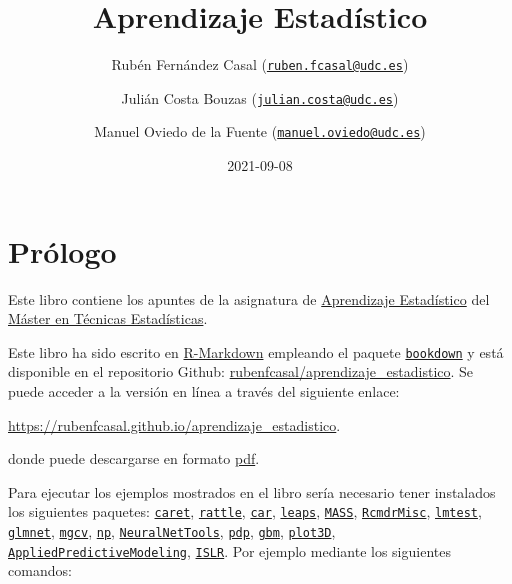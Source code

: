 \documentclass[
]{book}
\title{Aprendizaje Estadístico}
\author{Rubén Fernández Casal (\href{mailto:ruben.fcasal@udc.es}{\nolinkurl{ruben.fcasal@udc.es}}) \and Julián Costa Bouzas (\href{mailto:julian.costa@udc.es}{\nolinkurl{julian.costa@udc.es}}) \and Manuel Oviedo de la Fuente (\href{mailto:manuel.oviedo@udc.es}{\nolinkurl{manuel.oviedo@udc.es}})}
\date{2021-09-08}
\theoremstyle{break}
\theoremstyle{definition}
\theoremstyle{definition}
\theoremstyle{definition}
\theoremstyle{definition}
\theoremstyle{remark}
\begin{document}
\maketitle

{
\setcounter{tocdepth}{1}
\tableofcontents
}
\hypertarget{pruxf3logo}{%
\chapter*{Prólogo}\label{pruxf3logo}}

Este libro contiene los apuntes de la asignatura de \href{http://eamo.usc.es/pub/mte/index.php?option=com_content\&view=article\&id=74}{Aprendizaje Estadístico} del \href{http://eio.usc.es/pub/mte}{Máster en Técnicas Estadísticas}.

Este libro ha sido escrito en \href{http://rmarkdown.rstudio.com}{R-Markdown} empleando el paquete \href{https://bookdown.org/yihui/bookdown/}{\texttt{bookdown}} y está disponible en el repositorio Github: \href{https://github.com/rubenfcasal/aprendizaje_estadistico}{rubenfcasal/aprendizaje\_estadistico}.
Se puede acceder a la versión en línea a través del siguiente enlace:

\url{https://rubenfcasal.github.io/aprendizaje_estadistico}.

donde puede descargarse en formato \href{https://rubenfcasal.github.io/aprendizaje_estadistico/aprendizaje_estadistico.pdf}{pdf}.

Para ejecutar los ejemplos mostrados en el libro sería necesario tener instalados los siguientes paquetes:
\href{https://CRAN.R-project.org/package=caret}{\texttt{caret}}, \href{https://CRAN.R-project.org/package=rattle}{\texttt{rattle}}, \href{https://CRAN.R-project.org/package=car}{\texttt{car}}, \href{https://CRAN.R-project.org/package=leaps}{\texttt{leaps}}, \href{https://CRAN.R-project.org/package=MASS}{\texttt{MASS}}, \href{https://CRAN.R-project.org/package=RcmdrMisc}{\texttt{RcmdrMisc}}, \href{https://CRAN.R-project.org/package=lmtest}{\texttt{lmtest}}, \href{https://CRAN.R-project.org/package=glmnet}{\texttt{glmnet}}, \href{https://CRAN.R-project.org/package=mgcv}{\texttt{mgcv}}, \href{https://CRAN.R-project.org/package=np}{\texttt{np}}, \href{https://CRAN.R-project.org/package=NeuralNetTools}{\texttt{NeuralNetTools}}, \href{https://CRAN.R-project.org/package=pdp}{\texttt{pdp}}, \href{https://CRAN.R-project.org/package=gbm}{\texttt{gbm}}, \href{https://CRAN.R-project.org/package=plot3D}{\texttt{plot3D}}, \href{https://CRAN.R-project.org/package=AppliedPredictiveModeling}{\texttt{AppliedPredictiveModeling}}, \href{https://CRAN.R-project.org/package=ISLR}{\texttt{ISLR}}.
Por ejemplo mediante los siguientes comandos:
\end{document}
